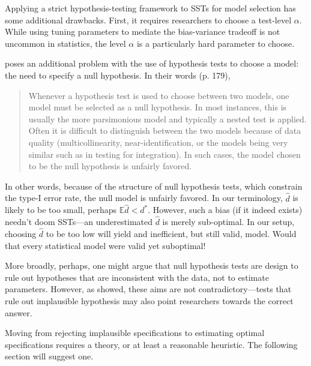 \documentclass[sts]{imsart}\usepackage[]{graphicx}\usepackage[]{color}
\newcommand{\dstar}{d^*}
\newcommand{\EE}{\mathbb{E}}
\begin{document}
Applying a strict hypothesis-testing framework to SSTs for model
selection has some additional drawbacks.
First, it requires researchers to choose a test-level $\alpha$. While
using tuning parameters to mediate the bias-variance tradeoff is not
uncommon in statistics, the level $\alpha$ is a particularly hard
parameter to choose.

\citet{granger} poses an additional problem with the use of
hypothesis tests to choose a model: the need to specify a null
hypothesis. In their words (p. 179),
\begin{quote}
Whenever a hypothesis test is used to choose between two models, one
model must be selected as a null hypothesis. In most instances, this
is usually the more parsimonious model and typically a nested test is
applied. Often it is difficult to distinguish between the two models
because of data quality (multicollinearity, near-identification, or
the models being very similar such as in testing for integration). In
such cases, the model chosen to be the null hypothesis is unfairly
favored.
\end{quote}
In other words, because of the structure of null hypothesis tests,
which constrain the type-I error rate, the null model is unfairly
favored.
In our terminology, $\hat{d}$ is likely to be too small, perhaps $\EE
\hat{d}<\dstar$.
However, such a bias (if it indeed exists) needn't doom SSTs---an
underestimated $\hat{d}$ is merely sub-optimal. In our setup, choosing
$\hat{d}$ to be too low will yield and inefficient, but still valid,
model.
Would that every statistical model were valid yet suboptimal!

More broadly, perhaps, one might argue that null hypothesis tests are
design to rule out hypotheses that are inconsistent with the data, not
to estimate parameters.
However, as \citet{hodgeslehmann} showed, these aims are not
contradictory---tests that rule out implausible hypothesis may also
point researchers towards the correct answer.

Moving from rejecting implausible specifications to estimating optimal
specifications requires a theory, or at least a reasonable heuristic.
The following section will suggest one.
\end{document}
